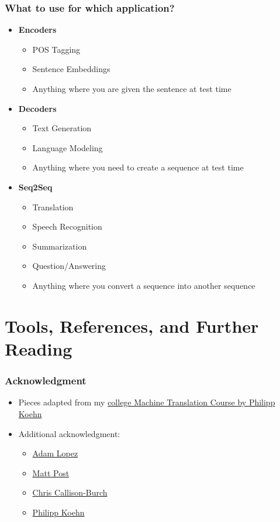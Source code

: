 \documentclass[usenames,dvipsnames]{beamer}
\begin{document}
\begin{frame}
  \frametitle{What to use for which application?}
  \begin{itemize}
    \item \textbf{Encoders}
    \begin{itemize}
      \item POS Tagging
      \item Sentence Embeddings
      \item Anything where you are given the sentence at test time
    \end{itemize}
    \item \textbf{Decoders}
    \begin{itemize}
      \item Text Generation
      \item Language Modeling
      \item Anything where you need to create a sequence at test time
    \end{itemize}
    \item \textbf{Seq2Seq}
      \begin{itemize}
        \item Translation
        \item Speech Recognition
        \item Summarization
        \item Question/Answering
        \item Anything where you convert a sequence into another sequence
      \end{itemize}
  \end{itemize}
\end{frame}


\section{Tools, References, and Further Reading}

\begin{frame}
  \frametitle{Acknowledgment}
  \begin{itemize}
    \item Pieces adapted from my \href{http://mt-class.org/jhu/}{college Machine Translation Course by Philipp Koehn}
    \item Additional acknowledgment:
    \begin{itemize}
      \item \href{http://alopez.github.io/}{Adam Lopez}
      \item \href{http://www.cs.jhu.edu/~post/}{Matt Post}
      \item \href{http://www.cis.upenn.edu/~ccb/}{Chris Callison-Burch}
      \item \href{http://www.cs.jhu.edu/~phi/}{Philipp Koehn}
    \end{itemize}
  \end{itemize}
\end{frame}
\end{document}
